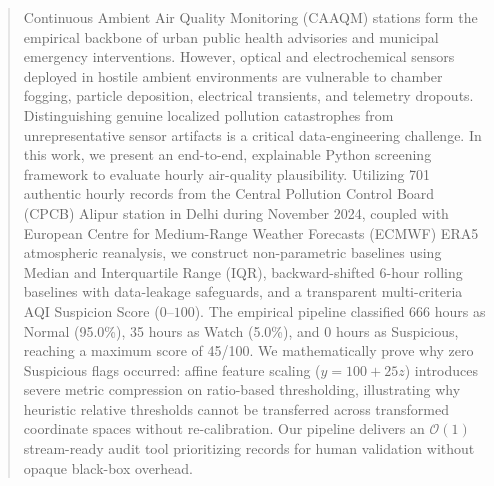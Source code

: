 \documentclass[twoside]{article}
\begin{document}

\begin{abstract}
Continuous Ambient Air Quality Monitoring (CAAQM) stations form the empirical backbone of urban public health advisories and municipal emergency interventions. However, optical and electrochemical sensors deployed in hostile ambient environments are vulnerable to chamber fogging, particle deposition, electrical transients, and telemetry dropouts. Distinguishing genuine localized pollution catastrophes from unrepresentative sensor artifacts is a critical data-engineering challenge. In this work, we present an end-to-end, explainable Python screening framework to evaluate hourly air-quality plausibility. Utilizing 701 authentic hourly records from the Central Pollution Control Board (CPCB) Alipur station in Delhi during November 2024, coupled with European Centre for Medium-Range Weather Forecasts (ECMWF) ERA5 atmospheric reanalysis, we construct non-parametric baselines using Median and Interquartile Range (IQR), backward-shifted 6-hour rolling baselines with data-leakage safeguards, and a transparent multi-criteria AQI Suspicion Score ($0$--$100$). The empirical pipeline classified 666 hours as Normal (95.0\%), 35 hours as Watch (5.0\%), and 0 hours as Suspicious, reaching a maximum score of 45/100. We mathematically prove why zero Suspicious flags occurred: affine feature scaling ($y = 100 + 25z$) introduces severe metric compression on ratio-based thresholding, illustrating why heuristic relative thresholds cannot be transferred across transformed coordinate spaces without re-calibration. Our pipeline delivers an $\mathcal{O}(1)$ stream-ready audit tool prioritizing records for human validation without opaque black-box overhead.
\end{abstract}
\end{document}
